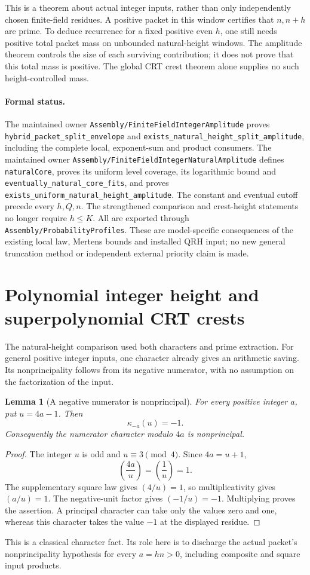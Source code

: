 \documentclass[11pt]{article}
\newtheorem{lemma}[theorem]{Lemma}
\begin{document}
This is a theorem about actual integer inputs, rather than only
independently chosen finite-field residues. A positive packet in this
window certifies that \(n,n+h\) are prime. To deduce recurrence for a
fixed positive even \(h\), one still needs positive total packet mass
on unbounded natural-height windows. The amplitude theorem controls
the size of each surviving contribution; it does not prove that this
total mass is positive. The global CRT crest theorem alone supplies
no such height-controlled mass.

\paragraph{Formal status.}
The maintained owner \texttt{Assembly/FiniteFieldIntegerAmplitude}
proves \texttt{hybrid\_packet\_split\_envelope} and
\texttt{exists\_natural\_height\_split\_amplitude}, including the complete
local, exponent-sum and product consumers.
The maintained owner \texttt{Assembly/FiniteFieldIntegerNaturalAmplitude}
defines \texttt{naturalCore}, proves its uniform level coverage, its
logarithmic bound and \texttt{eventually\_natural\_core\_fits}, and proves
\texttt{exists\_uniform\_natural\_height\_amplitude}.
The constant and eventual cutoff precede every \(h,Q,n\).
The strengthened comparison and crest-height statements no longer
require \(h\leq K\). All are exported through
\texttt{Assembly/ProbabilityProfiles}.
These are model-specific consequences of the existing local law,
Mertens bounds and installed QRH input; no new general truncation
method or independent external priority claim is made.

\section{Polynomial integer height and superpolynomial CRT crests}
The natural-height comparison used both characters and prime extraction.
For general positive integer inputs, one character already gives an
arithmetic saving. Its nonprincipality follows from its negative
numerator, with no assumption on the factorization of the input.

\begin{lemma}[A negative numerator is nonprincipal]\label{lem:negative-numerator-witness}
For every positive integer \(a\), put \(u=4a-1\). Then
\[
                         \kappa_{-a}(u)=-1.
\]
Consequently the numerator character modulo \(4a\) is nonprincipal.
\end{lemma}
\begin{proof}
The integer \(u\) is odd and \(u\equiv3\pmod4\). Since \(4a=u+1\),
\[
 \left(\frac{4a}{u}\right)=\left(\frac1u\right)=1.
\]
The supplementary square law gives \((4/u)=1\), so multiplicativity
gives \((a/u)=1\). The negative-unit factor gives \((-1/u)=-1\).
Multiplying proves the assertion. A principal character can take only
the values zero and one, whereas this character takes the value
\(-1\) at the displayed residue.
\end{proof}
This is a classical character fact. Its role here is to discharge the
actual packet's nonprincipality hypothesis for every \(a=hn>0\),
including composite and square input products.
\end{document}
